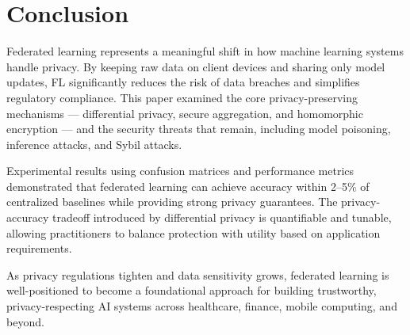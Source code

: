 \documentclass[conference]{IEEEtran}
\begin{document}
\section{Conclusion}

Federated learning represents a meaningful shift in how machine learning systems handle privacy. By keeping raw data on client devices and sharing only model updates, FL significantly reduces the risk of data breaches and simplifies regulatory compliance. This paper examined the core privacy-preserving mechanisms — differential privacy, secure aggregation, and homomorphic encryption — and the security threats that remain, including model poisoning, inference attacks, and Sybil attacks.

Experimental results using confusion matrices and performance metrics demonstrated that federated learning can achieve accuracy within 2--5\% of centralized baselines while providing strong privacy guarantees. The privacy-accuracy tradeoff introduced by differential privacy is quantifiable and tunable, allowing practitioners to balance protection with utility based on application requirements.

As privacy regulations tighten and data sensitivity grows, federated learning is well-positioned to become a foundational approach for building trustworthy, privacy-respecting AI systems across healthcare, finance, mobile computing, and beyond.
\end{document}
